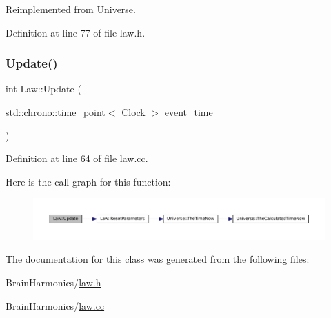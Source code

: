 Reimplemented from \mbox{\hyperlink{class_universe_a2d3d642bfdc863248e93535832fa4b00}{Universe}}.



Definition at line 77 of file law.\+h.

\mbox{\label{class_law_a0240b10c679b671039dbf10771342ea7}} 
\subsubsection{\texorpdfstring{Update()}{Update()}}
{\footnotesize\ttfamily int Law\+::\+Update (\begin{DoxyParamCaption}\item[{std\+::chrono\+::time\+\_\+point$<$ \mbox{\hyperlink{universe_8h_a0ef8d951d1ca5ab3cfaf7ab4c7a6fd80}{Clock}} $>$}]{event\+\_\+time }\end{DoxyParamCaption})}



Definition at line 64 of file law.\+cc.

Here is the call graph for this function\+:\nopagebreak
\begin{figure}[H]
\begin{center}
\leavevmode
\includegraphics[width=350pt]{class_law_a0240b10c679b671039dbf10771342ea7_cgraph}
\end{center}
\end{figure}


The documentation for this class was generated from the following files\+:\begin{DoxyCompactItemize}
\item 
Brain\+Harmonics/\mbox{\hyperlink{law_8h}{law.\+h}}\item 
Brain\+Harmonics/\mbox{\hyperlink{law_8cc}{law.\+cc}}\end{DoxyCompactItemize}
